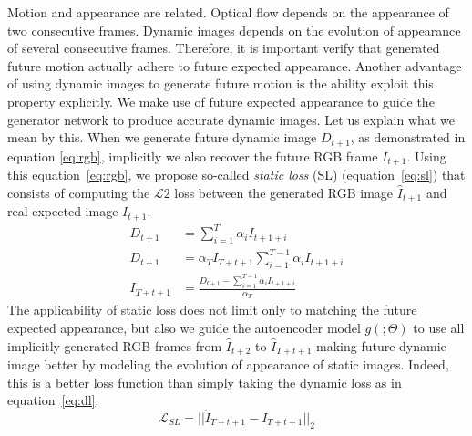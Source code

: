 Motion and appearance are related.
Optical flow depends on the appearance of two consecutive frames.
Dynamic images depends on the evolution of appearance of several consecutive frames.
Therefore, it is important verify that generated future motion actually adhere to future expected appearance.
Another advantage of using dynamic images to generate future motion is the ability exploit this property explicitly.
We make use of future expected appearance to guide the generator network to produce accurate dynamic images.
Let us explain what we mean by this. 
When we generate future dynamic image $D_{t+1}$, as demonstrated in equation \ref{eq:rgb}, implicitly we also recover the future RGB frame $I_{t+1}$. 
Using this equation~\ref{eq:rgb}, we propose so-called \emph{static loss} (SL) (equation~\ref{eq:sl}) that consists of computing the $\mathcal{L}2$ loss between the generated RGB image $\hat{I}_{t+1}$ and real expected image $I_{t+1}$.
% 
\begin{align}
\label{eq:rgb}
D_{t+1} &= \displaystyle \sum_{i=1}^{T} \alpha_{i} I_{t+1+i} \\ \nonumber
D_{t+1} &= \alpha_{T}I_{T+t+1} \displaystyle \sum_{i=1}^{T-1} \alpha_{i} I_{t+1+i} \\ \nonumber
I_{T+t+1} &= \frac{D_{t+1} - \displaystyle \sum_{i=1}^{T-1} \alpha_{i} I_{t+1+i}}{\alpha_{T}}
\end{align}
%
The applicability of static loss does not limit only to matching the future expected appearance, but also we guide the autoencoder model $g(;\Theta)$ to use all implicitly generated RGB frames from $\hat{I}_{t+2}$ to $\hat{I}_{T+t+1}$ making future dynamic image better by modeling the evolution of appearance of static images. Indeed, this is a better loss function than simply taking the dynamic loss as in equation~\ref{eq:dl}.
%
\begin{equation}
 \mathcal{L}_{SL} = ||\hat{I}_{T+t+1} - I_{T+t+1}||_2
 \label{eq:sl}
\end{equation}
%
